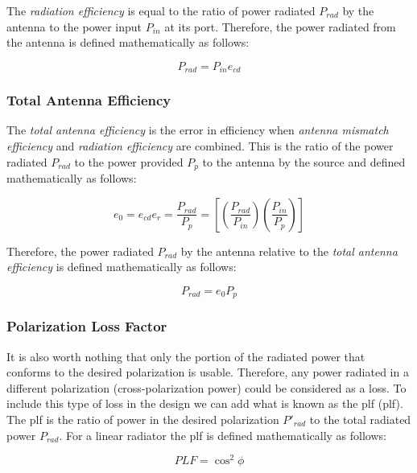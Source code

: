 \documentclass{article}
\begin{document}
The \textit{radiation efficiency} is equal to the ratio of power radiated $P_{rad}$ by the antenna to the power input $P_{in}$ at its port. Therefore, the power radiated from the antenna is defined mathematically as follows:

\begin{equation*}
    P_{rad} = P_{in} e_{cd}
\end{equation*}

\subsubsection{Total Antenna Efficiency}
The \textit{total antenna efficiency} is the error in efficiency when \textit{antenna mismatch efficiency} and \textit{radiation efficiency} are combined. This is the ratio of the power radiated $P_{rad}$ to the power provided $P_p$ to the antenna by the source and defined mathematically as follows:

\begin{equation}\label{totalEfficiency}
    e_0 = e_{cd} e_r = \dfrac{P_{rad}}{P_p} = \left[ \left( \dfrac{P_{rad}}{P_{in}} \right) \left( \dfrac{P_{in}}{P_p} \right) \right]
\end{equation}

Therefore, the power radiated $P_{rad}$ by the antenna relative to the \textit{total antenna efficiency} is defined mathematically as follows:

\begin{equation*}
    P_{rad} = e_0 P_p
\end{equation*}

\subsubsection{Polarization Loss Factor}
It is also worth nothing that only the portion of the radiated power that conforms to the desired polarization is usable. Therefore, any power radiated in a different polarization (cross-polarization power) could be considered as a loss. To include this type of loss in the design we can add what is known as the \acrlong{plf} (\acrshort{plf}). The \acrshort{plf} is the ratio of power in the desired polarization $P'_{rad}$ to the total radiated power $P_{rad}$. For a linear radiator the \acrshort{plf} is defined mathematically as follows:

\begin{equation}\label{plf}
    PLF = \cos^2{\phi}
\end{equation}
\end{document}
